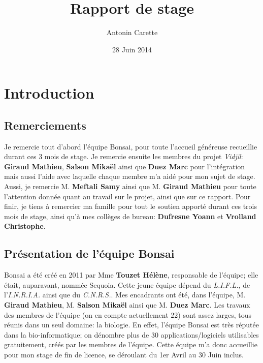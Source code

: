 \documentclass{report}
\title{Rapport de stage}
\author{Antonin Carette}
\date{28 Juin 2014}
\begin{document}
\maketitle

\tableofcontents


\chapter{Introduction}

\section{Remerciements}
Je remercie tout d'abord l'équipe Bonsai, pour toute l'accueil généreuse recueillie durant ces 3 mois de stage.
\newline 
Je remercie ensuite les membres du projet \textit{Vidjil}: \textbf{Giraud Mathieu}, \textbf{Salson Mikaël} ainsi que \textbf{Duez Marc} pour l'intégration mais aussi l'aide avec laquelle chaque membre m'a aidé pour mon sujet de stage.
\newline
Aussi, je remercie M. \textbf{Meftali Samy} ainsi que M. \textbf{Giraud Mathieu} pour toute l'attention donnée quant au travail sur le projet, ainsi que sur ce rapport.
\newline
Pour finir, je tiens à remercier ma famille pour tout le soutien apporté durant ces trois mois de stage, ainsi qu'à mes collèges de bureau: \textbf{Dufresne Yoann} et \textbf{Vrolland Christophe}.

\section{Présentation de l'équipe Bonsai}
Bonsai a été créé en 2011 par Mme \textbf{Touzet Hélène}, responsable de l'équipe; elle était, auparavant, nommée Sequoia.
\newline
Cette jeune équipe dépend du \textit{L.I.F.L.}, de l'\textit{I.N.R.I.A.} ainsi que du \textit{C.N.R.S.}.
\newline
Mes encadrants ont été, dans l'équipe, M. \textbf{Giraud Mathieu}, M. \textbf{Salson Mikaël} ainsi que M. \textbf{Duez Marc}.
\newline
Les travaux des membres de l'équipe (on en compte actuellement 22) sont assez larges, tous réunis dans un seul domaine: la biologie.
\newline
En effet, l'équipe Bonsai est très réputée dans la bio-informatique; on dénombre plus de 30 applications/logiciels utilisables gratuitement, créés par les membres de l'équipe.
\newline
Cette équipe m'a donc accueillie pour mon stage de fin de licence, se déroulant du 1er Avril au 30 Juin inclus.
\end{document}

